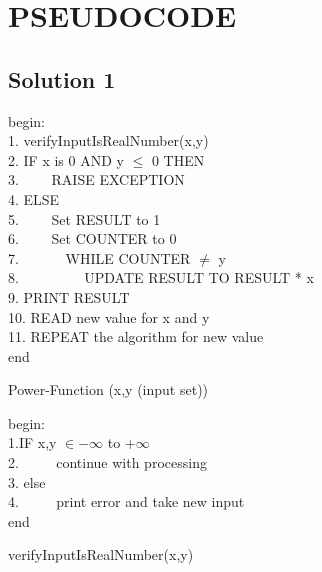 \documentclass[a4paper,12pt]{article}
\begin{document}


\section{PSEUDOCODE}

\subsection{Solution 1}
\begin{algorithm}[H]
	begin: \\
	1. verifyInputIsRealNumber(x,y)\\
	2. IF x is 0 AND y $\leq$ 0 THEN \\
	3. $\hspace{2em}$RAISE EXCEPTION	\\
	4. ELSE \\
	5. $\hspace{2em}$Set RESULT to 1 \\
	6. $\hspace{2em}$Set COUNTER to 0\\
	7. $\hspace{3em}$WHILE COUNTER $\neq$ y \\
	8. $\hspace{4em}$ UPDATE RESULT TO RESULT * x\\
	9. 	PRINT RESULT \\
	10. READ new value for x and y\\
	11. REPEAT the algorithm for new value \\
	end
	\caption{Power-Function (x,y (input set))}
\end{algorithm}

\vspace{0.5cm}

\begin{algorithm}
	begin:\\
	1.IF  x,y $\in -\infty$  to  +$\infty$ \\
	2. $\hspace{2em}$ continue with processing\\
	3. else\\
	4. $\hspace{2em}$ print error and take new input \\
	end
	\caption{verifyInputIsRealNumber(x,y)}
\end{algorithm}
\end{document}
